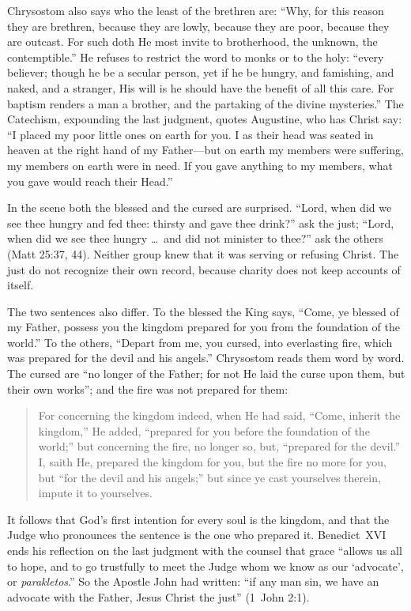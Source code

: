Chrysostom also says who the least of the brethren are: ``Why, for this reason they are brethren, because they are lowly, because they are poor, because they are outcast. For such doth He most invite to brotherhood, the unknown, the contemptible.'' He refuses to restrict the word to monks or to the holy: ``every believer; though he be a secular person, yet if he be hungry, and famishing, and naked, and a stranger, His will is he should have the benefit of all this care. For baptism renders a man a brother, and the partaking of the divine mysteries.'' The Catechism, expounding the last judgment, quotes Augustine, who has Christ say: ``I placed my poor little ones on earth for you. I as their head was seated in heaven at the right hand of my Father---but on earth my members were suffering, my members on earth were in need. If you gave anything to my members, what you gave would reach their Head.''

In the scene both the blessed and the cursed are surprised. ``Lord, when did we see thee hungry and fed thee: thirsty and gave thee drink?'' ask the just; ``Lord, when did we see thee hungry \ldots\ and did not minister to thee?'' ask the others (Matt 25:37, 44). Neither group knew that it was serving or refusing Christ. The just do not recognize their own record, because charity does not keep accounts of itself.

The two sentences also differ. To the blessed the King says, ``Come, ye blessed of my Father, possess you the kingdom prepared for you from the foundation of the world.'' To the others, ``Depart from me, you cursed, into everlasting fire, which was prepared for the devil and his angels.'' Chrysostom reads them word by word. The cursed are ``no longer of the Father; for not He laid the curse upon them, but their own works''; and the fire was not prepared for them:

\begin{quote}
\ifdefined\TriptychPrintEdition
{}
\else
\fi
For concerning the kingdom indeed, when He had said, ``Come, inherit the kingdom,'' He added, ``prepared for you before the foundation of the world;'' but concerning the fire, no longer so, but, ``prepared for the devil.'' I, saith He, prepared the kingdom for you, but the fire no more for you, but ``for the devil and his angels;'' but since ye cast yourselves therein, impute it to yourselves.\par
\end{quote}

It follows that God's first intention for every soul is the kingdom, and that the Judge who pronounces the sentence is the one who prepared it. Benedict~XVI ends his reflection on the last judgment with the counsel that grace ``allows us all to hope, and to go trustfully to meet the Judge whom we know as our `advocate', or \emph{parakletos}.'' So the Apostle John had written: ``if any man sin, we have an advocate with the Father, Jesus Christ the just'' (1~John 2:1).
